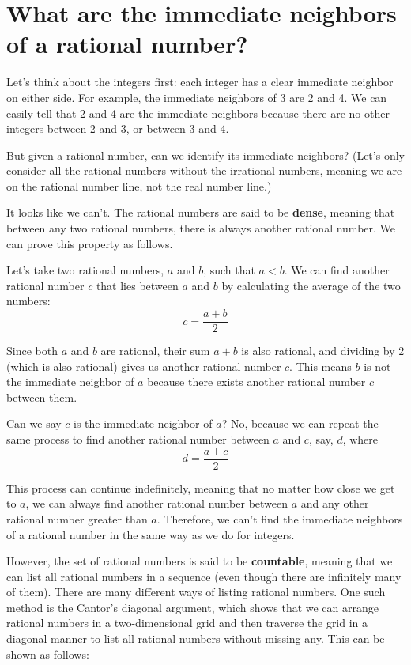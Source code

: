 \documentclass[12pt, letterpaper, oneside]{article}
\begin{document}
\section{What are the immediate neighbors of a rational number?}

Let's think about the integers first: each integer has a clear immediate neighbor on either side. For example, the
immediate neighbors of 3 are 2 and 4. We can easily tell that 2 and 4 are the immediate neighbors because there are no
other integers between 2 and 3, or between 3 and 4.

But given a rational number, can we identify its immediate neighbors? (Let's only consider all the rational numbers
without the irrational numbers, meaning we are on the rational number line, not the real number line.)

It looks like we can't. The rational numbers are said to be \textbf{dense}, meaning that between any two rational
numbers, there is always another rational number. We can prove this property as follows.

Let's take two rational numbers, \(a\) and \(b\), such that \(a < b\). We can find another rational number \(c\) that
lies between \(a\) and \(b\) by calculating the average of the two numbers:
\[c = \frac{a + b}{2}\]

Since both \(a\) and \(b\) are rational, their sum \(a + b\) is also rational, and dividing by 2 (which is also
rational) gives us another rational number \(c\). This means \(b\) is not the immediate neighbor of \(a\) because there
exists another rational number \(c\) between them.

Can we say \(c\) is the immediate neighbor of \(a\)? No, because we can repeat the same process to find another rational
number between \(a\) and \(c\), say, \(d\), where
\[d = \frac{a + c}{2}\]

This process can continue indefinitely, meaning that no matter how close we get to \(a\), we can always find another
rational number between \(a\) and any other rational number greater than \(a\). Therefore, we can't find the immediate
neighbors of a rational number in the same way as we do for integers.

However, the set of rational numbers is said to be \textbf{countable}, meaning that we can list all rational numbers in
a sequence (even though there are infinitely many of them). There are many different ways of listing rational numbers.
One such method is the Cantor's diagonal argument, which shows that we can arrange rational numbers in a two-dimensional
grid and then traverse the grid in a diagonal manner to list all rational numbers without missing any. This can be shown
as follows:
\end{document}
